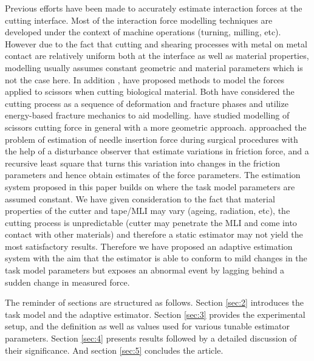 \documentclass[letterpaper, 10 pt, conference]{ieeeconf}  %
\begin{document}
Previous efforts have been made to accurately estimate interaction forces at the cutting interface. Most of the interaction force modelling techniques are developed under the context of machine operations (turning, milling, etc). However due to the fact that cutting and shearing processes with metal on metal contact are relatively uniform both at the interface as well as material properties, modelling usually assumes constant geometric and material parameters which is not the case here. In addition \cite{laparoscissors} ,\cite{scissors} have proposed methods to model the forces applied to scissors when cutting biological material. Both have considered the cutting process as a sequence of deformation and fracture phases and utilize energy-based fracture mechanics to aid modelling. \cite{analyScis} have studied modelling of scissors cutting force in general with a more geometric approach. \cite{needle} approached the problem of estimation of needle insertion force during surgical procedures with the help of a disturbance observer that estimate variations in friction force, and a recursive least square that turns this variation into changes in the friction parameters and hence obtain estimates of the force parameters. The estimation system proposed in this paper builds on \cite{isha} where the task model parameters are assumed constant. We have given consideration to the fact that material properties of the cutter and tape/MLI may vary (ageing, radiation, etc), the cutting process is unpredictable (cutter may penetrate the MLI and come into contact with other materials) and therefore a static estimator may not yield the most satisfactory results. Therefore we have proposed an adaptive estimation system with the aim that the estimator is able to conform to mild changes in the task model parameters but exposes an abnormal event by lagging behind a sudden change in measured force. 

The reminder of sections are structured as follows. Section \ref{sec:2} introduces the task model and the adaptive estimator. Section \ref{sec:3} provides the experimental setup, and the definition as well as values used for various tunable estimator parameters. Section \ref{sec:4} presents results followed by a detailed discussion of their significance. And section \ref{sec:5} concludes the article.

\end{document}
